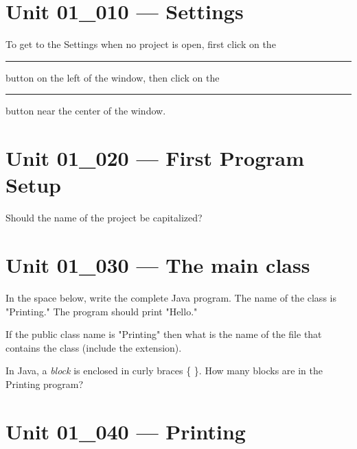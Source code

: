 \documentclass[letterpaper,12pt]{exam}
\newcommand{\unit}{Unit 01}
\begin{document}
\begin{questions}

\section*{\unit\_010 --- Settings} %

\begin{samepage}
	\question To get to the Settings when no project is open, first click on the \rule{30mm}{0.15mm} button on the left of the window, then click on the \rule{30mm}{0.15mm} button near the center of the window.
\end{samepage}

\section*{\unit\_020 --- First Program Setup} %

\begin{samepage}
	\question Should the name of the project be capitalized?  
\end{samepage}

\section*{\unit\_030 --- The main class} %

\begin{samepage}
	\question In the space below, write the complete Java program.  The name of the class is "Printing." The program should print "Hello."
\end{samepage}
\vspace{100mm}
\begin{samepage}
	\question If the public class name is "Printing" then what is the name of the file that contains the class (include the extension). 
	\vspace{5mm}
\end{samepage}

\begin{samepage}
	\question  In Java, a \emph{block} is enclosed in curly braces \{ \}.  How many blocks are in the Printing program?
	\vspace{5mm}
\end{samepage}

\section*{\unit\_040 --- Printing} %


\end{questions}
\end{document}
